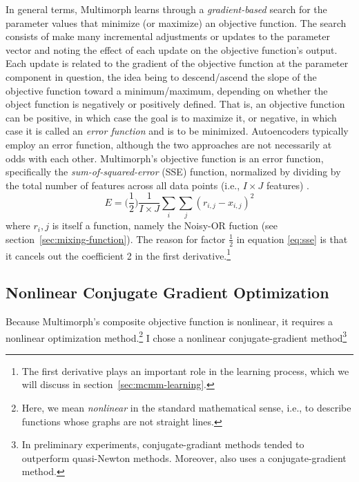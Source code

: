 In general terms, Multimorph learns through a \emph{gradient-based} 
search for the parameter values that minimize (or maximize) an objective function. The search consists of make many  incremental adjustments or updates to the parameter vector and noting the effect of each update on the objective function's output. Each update is related to the gradient 
of the objective function at the parameter component in question, the idea being to descend/ascend 
the slope of the objective function toward a minimum/maximum, depending 
on whether the object function is negatively or positively defined. 
That is, an objective function can be positive, in which case the goal is to maximize it, 
or negative, in which case it is
called an \emph{error function} and is to be minimized. Autoencoders typically 
employ an error function, although the two approaches are not necessarily at odds 
with each other. 
Multimorph's objective function is an error function, specifically the \emph{sum-of-squared-error} (SSE)  function, normalized 
by dividing by the total number of features across
all data points (i.e., $I \times J$ features) \citep{somandepalli:2018}.
\begin{equation} \label{eq:sse}
E = \bigg(\frac{1}{2}\bigg) \frac{1}{I \times J}\sum_{i} \sum_{j} {(r_{i,j} - x_{i,j})}^2
\end{equation}
where $r_i,j$ is itself a function, namely the Noisy-OR fuction (see section~\ref{sec:mixing-function}). The reason for factor $\frac{1}{2}$ in equation \eqref{eq:sse} is that it cancels out the coefficient 2 in the first derivative.\footnote{The first derivative plays an important role in the learning process, which we will discuss in section~\ref{sec:mcmm-learning}.}

\subsection{Nonlinear Conjugate Gradient Optimization}
\label{sec:ncg-gen}
Because Multimorph's composite objective function is nonlinear, it requires a nonlinear optimization method.\footnote{Here, we mean \emph{nonlinear} in the standard mathematical sense, i.e., to describe functions whose graphs are not straight lines.} I chose a nonlinear conjugate-gradient method\footnote{In preliminary experiments, conjugate-gradiant methods tended to outperform quasi-Newton methods. Moreover, \citet{saund:94} also uses a conjugate-gradient method.} 

